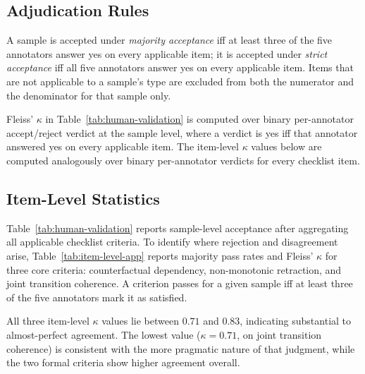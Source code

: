 \subsection{Adjudication Rules}
\label{app:validation-adjudication}

A sample is accepted under \emph{majority acceptance} iff at least three of the five annotators answer yes on every applicable item; it is accepted under \emph{strict acceptance} iff all five annotators answer yes on every applicable item. Items that are not applicable to a sample's type are excluded from both the numerator and the denominator for that sample only.

Fleiss' $\kappa$ in Table~\ref{tab:human-validation} is computed over binary per-annotator accept/reject verdict at the sample level, where a verdict is yes iff that annotator answered yes on every applicable item. The item-level $\kappa$ values below are computed analogously over binary per-annotator verdicts for every checklist item.

\subsection{Item-Level Statistics}
\label{app:validation-item-level}

Table~\ref{tab:human-validation} reports sample-level acceptance after aggregating all applicable checklist criteria. To identify where rejection and disagreement arise, Table~\ref{tab:item-level-app} reports majority pass rates and Fleiss' $\kappa$ for three core criteria: counterfactual dependency, non-monotonic retraction, and joint transition coherence. A criterion passes for a given sample iff at least three of the five annotators mark it as satisfied.

All three item-level $\kappa$ values lie between $0.71$ and $0.83$, indicating substantial to almost-perfect agreement. The lowest value ($\kappa = 0.71$, on joint transition coherence) is consistent with the more pragmatic nature of that judgment, while the two formal criteria show higher agreement overall.

